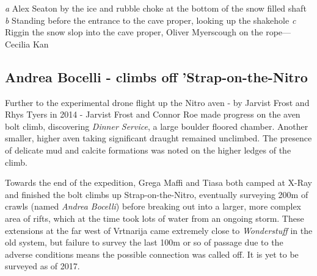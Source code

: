 \begin{pagefigure}
\checkoddpage \ifoddpage \forcerectofloat \else \forceversofloat \fi
\centering
    \begin{subfigure}[t]{0.565\textwidth}
        \centering
        \caption{} \label{At the bottom of the lead}
    \end{subfigure}
        \hfill
\begin{subfigure}[t]{0.424\textwidth}
\centering
{}
 \caption{}\label{bottom of snowplug}
\end{subfigure}
    \vspace{0cm}
    \begin{subfigure}[t]{\textwidth}
    \centering
        \caption{} \label{Rigging the new cave}
    \end{subfigure}
    \caption{
    \emph{a}  Alex Seaton by the ice and rubble choke at the bottom of the snow filled shaft
     \emph{b} Standing before the entrance to the cave proper, looking up the shakehole
     \emph{c}  Riggin the snow slop into the cave proper, Oliver Myerscough on the rope--- Cecilia Kan }
\end{pagefigure}

\subsection{Andrea Bocelli - climbs off 'Strap-on-the-Nitro}
Further to the experimental drone flight up the Nitro aven - by Jarvist Frost and Rhys Tyers in 2014 - Jarvist Frost and Connor Roe made progress on the aven bolt climb, discovering \emph{Dinner Service}, a large boulder floored chamber. Another smaller, higher aven taking significant draught remained unclimbed. The presence of delicate mud and calcite formations was noted on the higher ledges of the climb.

Towards the end of the expedition, Grega Maffi and Tiasa both camped at X-Ray and finished the bolt climbs up Strap-on-the-Nitro, eventually surveying 200m of crawls (named \emph{Andrea Bocelli}) before breaking out into a larger, more complex area of rifts, which at the time took lots of water from an ongoing storm. These extensions at the far west of Vrtnarija came extremely close to \emph{Wonderstuff} in the old system, but failure to survey the last 100m or so of passage due to the adverse conditions means the possible connection was called off. It is yet to be surveyed as of 2017.

